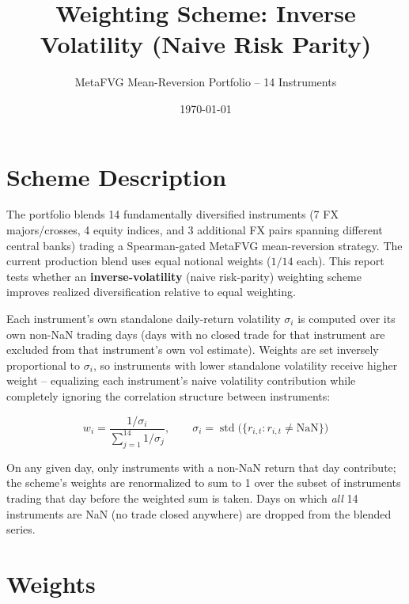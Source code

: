 \documentclass[11pt]{article}
\title{Weighting Scheme: Inverse Volatility (Naive Risk Parity)}
\author{MetaFVG Mean-Reversion Portfolio -- 14 Instruments}
\date{\today}
\begin{document}
\maketitle

\section{Scheme Description}

The portfolio blends 14 fundamentally diversified instruments (7 FX majors/crosses,
4 equity indices, and 3 additional FX pairs spanning different central banks) trading
a Spearman-gated MetaFVG mean-reversion strategy. The current production blend uses
equal notional weights (\(1/14\) each). This report tests whether an
\textbf{inverse-volatility} (naive risk-parity) weighting scheme improves realized
diversification relative to equal weighting.

Each instrument's own standalone daily-return volatility \(\sigma_i\) is computed over
its own non-NaN trading days (days with no closed trade for that instrument are
excluded from that instrument's own vol estimate). Weights are set inversely
proportional to \(\sigma_i\), so instruments with lower standalone volatility receive
higher weight -- equalizing each instrument's naive volatility contribution while
completely ignoring the correlation structure between instruments:

\begin{equation}
w_i = \frac{1/\sigma_i}{\sum_{j=1}^{14} 1/\sigma_j}, \qquad
\sigma_i = \operatorname{std}\big(\{r_{i,t} : r_{i,t} \neq \text{NaN}\}\big)
\end{equation}

On any given day, only instruments with a non-NaN return that day contribute; the
scheme's weights are renormalized to sum to 1 over the subset of instruments trading
that day before the weighted sum is taken. Days on which \emph{all} 14 instruments are
NaN (no trade closed anywhere) are dropped from the blended series.

\section{Weights}
\end{document}
